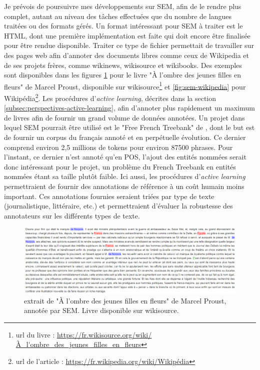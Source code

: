 \documentclass[PhD-Yoann-Dupont.tex]{subfiles}
\begin{document}
Je prévois de poursuivre mes développements sur SEM, afin de le rendre plus complet, autant au niveau des tâches effectuées que du nombre de langues traitées ou des formats gérés. Un format intéressant pour SEM à traiter est le HTML, dont une première implémentation est faite qui doit encore être finalisée pour être rendue disponible. Traiter ce type de fichier permettait de travailler sur des pages web afin d'annoter des documents libres comme ceux de Wikipedia et de ses projets frères, comme wikinews, wikisource et wikibooks. Des exemples sont disponibles dans les figures \ref{fig:sem-wikisource} pour le livre "À l'ombre des jeunes filles en fleurs" de Marcel Proust, disponible sur wikisource\footnote{url du livre : \url{https://fr.wikisource.org/wiki/À_l'ombre_des_jeunes_filles_en_fleurs}} et \ref{fig:sem-wikipedia} pour Wikipédia\footnote{url de l'article : \url{https://fr.wikipedia.org/wiki/Wikipédia}}. Les procédures d'\textit{active learning}, décrites dans la section \ref{subsec:perspectives-active-learning}, afin d'annoter plus rapidement un maximum de livres afin de fournir un grand volume de données annotées. Un projet dans lequel SEM pourrait être utilisé est le "Free French Treebank" de \citet{hernandez2013construction}, dont le but est de fournir un corpus du français annoté et en perpétuelle évolution. Ce dernier comprend environ 2,5 millions de tokens pour environ 87500 phrases. Pour l'instant, ce dernier n'est annoté qu'en POS, l'ajout des entités nommées serait donc intéressant pour le projet, un problème du French Treebank en entités nommées étant sa taille plutôt faible. Ici aussi, les procédures d'\textit{active learning} permettraient de fournir des annotations de référence à un coût humain moins important. Ces annotations fournies seraient triées par type de texte (journalistique, littéraire, etc.) et permettraient d'évaluer la robustesse des annotateurs sur les différents types de texte.

\begin{figure}[ht!]
\centering
\includegraphics[scale=0.5]{images/SEM/futur-sem-wikisource}
\caption{extrait de "À l'ombre des jeunes filles en fleurs" de Marcel Proust, annotée par SEM. Livre disponible sur wikisource.}
\label{fig:sem-wikisource}
\end{figure}
\end{document}
